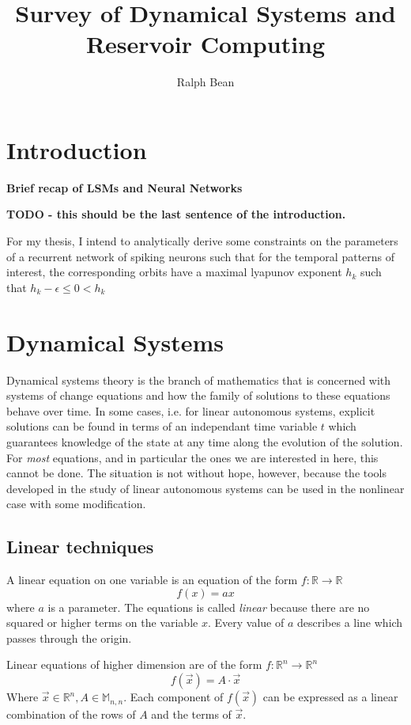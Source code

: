 \documentclass{elsart}
\begin{document}
\begin{frontmatter}

\title{Survey of Dynamical Systems and Reservoir Computing}

\author{Ralph Bean}

\end{frontmatter}

\section{Introduction}

\textbf{Brief recap of LSMs and Neural Networks}

\textbf{TODO - this should be the last sentence of the introduction.}

For my thesis, I intend to analytically derive some constraints on the parameters of a recurrent network of spiking neurons such that for the temporal patterns of interest, the corresponding orbits have a maximal lyapunov exponent $h_{k}$ such that $h_{k} - \epsilon \leq 0 < h_{k}$


\section{Dynamical Systems}
Dynamical systems theory is the branch of mathematics that is 
concerned with systems of change equations and how the family of
solutions to these equations behave over time.
In some cases, i.e. for linear
autonomous systems, explicit solutions can be found in terms of an
independant time variable $t$ which guarantees knowledge of the state at
any time along the evolution of the solution.  For \textit{most} equations, and
in particular the ones we are interested in here, this cannot be done.
The situation is not without hope, however, because the tools developed 
in the study of linear autonomous systems can be used in the nonlinear 
case with some modification.


\subsection{Linear techniques}
A linear equation on one variable is an equation of the form
$f : \mathbb{R} \rightarrow \mathbb{R}$
$$f(x) = ax$$ where $a$ is a parameter.
The equations is called
\textit{linear} because there are no squared or higher terms on the variable
$x$.  Every value of $a$ describes a line which passes through the origin. 

Linear equations of higher dimension are of the form 
$f : \mathbb{R}^{n} \rightarrow \mathbb{R}^{n}$
$$f(\vec{x}) = A \cdot \vec{x}$$
Where $\vec{x} \in \mathbb{R}^{n}, A \in \mathbb{M}_{n,n}$.  Each 
component of $f(\vec{x})$ can be expressed as a linear combination of the 
rows of $A$ and the terms of $\vec{x}$.
\end{document}
